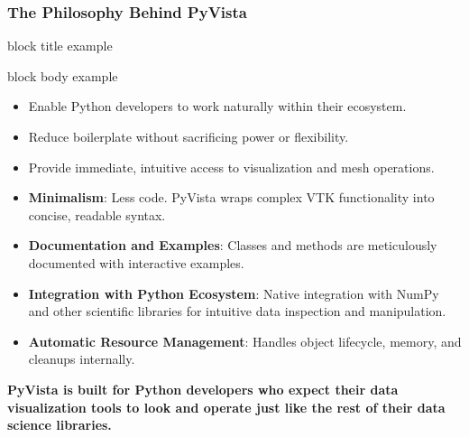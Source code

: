\documentclass[t]{beamer}
\newenvironment{customexampleblock}[1]{
    \begin{center}
        \begin{beamercolorbox}[wd=\textwidth, sep=0.05em, rounded=true, center]{block title example}
            \makebox[\textwidth][c]{\textbf{#1}}
        \end{beamercolorbox}
        \begin{beamercolorbox}[wd=\textwidth, sep=0.05em, rounded=true, center]{block body example}
}{
        \end{beamercolorbox}
    \end{center}
}
\begin{document}
\begin{frame}
    \frametitle{The Philosophy Behind PyVista}

    \begin{customexampleblock}{Guiding Principles}
        \begin{itemize}[leftmargin=10pt, label=]
            \vspace{-5pt}
            \item Enable Python developers to work naturally within their ecosystem.
            \item Reduce boilerplate without sacrificing power or flexibility.
            \item Provide immediate, intuitive access to visualization and mesh operations.
        \end{itemize}
    \end{customexampleblock}


    \begin{itemize}[leftmargin=10pt, label=]
        \item \textbf{Minimalism}: Less code. PyVista wraps complex VTK functionality into concise, readable syntax.
        \item \textbf{Documentation and Examples}: Classes and methods are meticulously documented with interactive examples.
        \item \textbf{Integration with Python Ecosystem}: Native integration with NumPy and other scientific libraries for intuitive data inspection and manipulation.
        \item \textbf{Automatic Resource Management}: Handles object lifecycle, memory, and cleanups internally.
    \end{itemize}

    \centering
    \textbf{PyVista is built for Python developers who expect their data visualization tools to look and operate just like the rest of their data science libraries.}

\end{frame}
\end{document}
